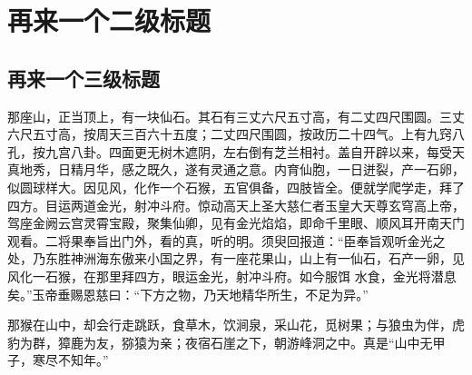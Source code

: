 \section{再来一个二级标题}

\subsection{再来一个三级标题}

那座山，正当顶上，有一块仙石。其石有三丈六尺五寸高，有二丈四尺围圆。三丈六尺五寸高，按周天三百六十五度；二丈四尺围圆，按政历二十四气。上有九窍八孔，按九宫八卦。四面更无树木遮阴，左右倒有芝兰相衬。盖自开辟以来，每受天真地秀，日精月华，感之既久，遂有灵通之意。内育仙胞，一日迸裂，产一石卵，似圆球样大。因见风，化作一个石猴，五官俱备，四肢皆全。便就学爬学走，拜了四方。目运两道金光，射冲斗府。惊动高天上圣大慈仁者玉皇大天尊玄穹高上帝，驾座金阙云宫灵霄宝殿，聚集仙卿，见有金光焰焰，即命千里眼、顺风耳开南天门观看。二将果奉旨出门外，看的真，听的明。须臾回报道：``臣奉旨观听金光之处，乃东胜神洲海东傲来小国之界，有一座花果山，山上有一仙石，石产一卵，见风化一石猴，在那里拜四方，眼运金光，射冲斗府。如今服饵 水食，金光将潜息矣。''玉帝垂赐恩慈曰：``下方之物，乃天地精华所生，不足为异。''

那猴在山中，却会行走跳跃，食草木，饮涧泉，采山花，觅树果；与狼虫为伴，虎豹为群，獐鹿为友，猕猿为亲；夜宿石崖之下，朝游峰洞之中。真是``山中无甲子，寒尽不知年。''

